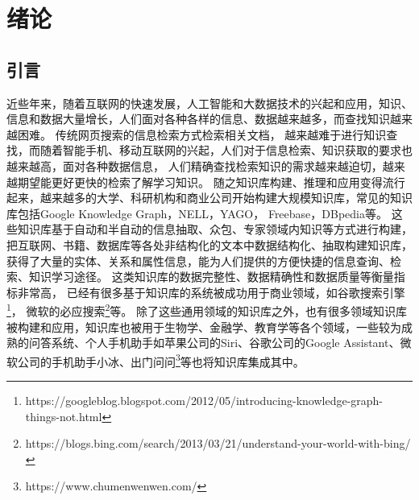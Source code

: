 

\chapter{绪论}
\label{cha:intro}
\section{引言}

近些年来，随着互联网的快速发展，人工智能和大数据技术的兴起和应用，知识、信息和数据大量增长，人们面对各种各样的信息、数据越来越多，而查找知识越来越困难。
传统网页搜索的信息检索方式检索相关文档，
越来越难于进行知识查找，而随着智能手机、移动互联网的兴起，人们对于信息检索、知识获取的要求也越来越高，面对各种数据信息，
人们精确查找检索知识的需求越来越迫切，越来越期望能更好更快的检索了解学习知识。
随之知识库构建、推理和应用变得流行起来，越来越多的大学、科研机构和商业公司开始构建大规模知识库，常见的知识库包括Google Knowledge Graph\cite{Dong2014FromDF}，NELL\cite{NELL-aaai15}，YAGO\cite{Suchanek:2007:YCS:1242572.1242667}，
Freebase\cite{Bollacker2008FreebaseAC}，DBpedia\cite{Bizer:2009:DCP:1640541.1640848}等。
这些知识库基于自动和半自动的信息抽取\cite{Gao2005KnowledgeBasedIE}、众包\cite{Meng2017KnowledgeBS}、专家领域内知识\cite{Shenassa2008KnowledgeBE}等方式进行构建，
把互联网、书籍、数据库等各处非结构化的文本中数据结构化、抽取构建知识库，
获得了大量的实体、关系和属性信息，能为人们提供的方便快捷的信息查询、检索、知识学习途径。
这类知识库的数据完整性、数据精确性和数据质量等衡量指标非常高，
已经有很多基于知识库的系统被成功用于商业领域，如谷歌搜索引擎\footnote{https://googleblog.blogspot.com/2012/05/introducing-knowledge-graph-things-not.html}，
微软的必应搜索\footnote{https://blogs.bing.com/search/2013/03/21/understand-your-world-with-bing/}等。
除了这些通用领域的知识库之外，也有很多领域知识库被构建和应用，知识库也被用于生物学\cite{Dumontier:2014:BRL:2878453.2878554}、金融学、教育学等各个领域，一些较为成熟的问答系统、个人手机助手如苹果公司的Siri、谷歌公司的Google Assistant、微软公司的手机助手小冰、出门问问\footnote{https://www.chumenwenwen.com/}等也将知识库集成其中。

